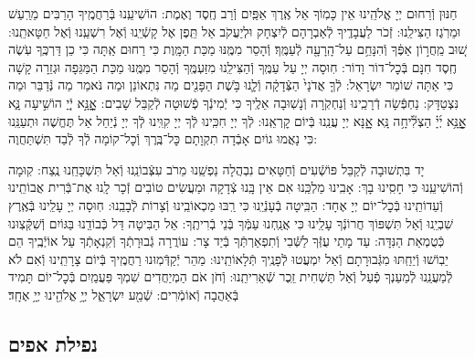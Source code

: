 \documentclass[twoside, openany, parskip=half, 11pt]{book}
\begin{document}
חַנּוּן וְֿרַחוּם יְיָ אֱלֹהֵֽינוּ אֵין כָּמֽוֹךָ אֵל אֶֽרֶךְ אַפַּֽיִם וְֿרַב חֶֽסֶד וֶאֶמֶת: הוֹשִׁיעֵֽנוּ בְּֿרַחֲמֶֽיךָ הָרַבִּים מֵרַֽעַשׁ וּמֵרֹֽגֶז הַצִּילֵֽנוּ: זְֿכֹר לַעֲבָדֶֽיךָ לְֿאַבְרָהָם לְֿיִצְחָק וּלְיַעֲקֹב אַל תֵּֽפֶן אֶל קָשְֿׁיֵֽנוּ וְֿאֶל רִשְׁעֵֽנוּ וְֿאֶל חַטָּאתֵֽנוּ:
שׁ֚וּב מֵֽחֲר֣וֹן אַפֶּ֔ךָ וְֿהִנָּחֵ֥ם עַל־הָֽרָעָ֖ה לְֿעַמֶּֽךָ׃ וְֿהָסֵר מִמֶּֽנּוּ מַכַּת הַמָּֽוֶת כִּי רַחוּם אַֽתָּה כִּי כֵן דַּרְכֶּֽךָ עֹֽשֶׂה חֶֽסֶד חִנָּם בְּֿכׇל־דוֹר וָדוֹר: חֽוּסָה יְיָ עַל עַמֶּֽךָ וְֿהַצִּילֵֽנוּ מִזַּעְמֶּֽךָ וְֿהָסֵר מִמֶּֽנּוּ מַכַּת הַמַּגֵּפָה וּגְזֵרָה קָשָׁה כִּי אַתָּה שׁוֹמֵר יִשְׂרָאֵל:
לְֿךָ֤ אֲדֹנָי֙ הַצְּֿדָקָ֔ה וְֿלָ֛נוּ בֹּ֥שֶׁת הַפָּנִ֖ים מַה נִּתְאוֹנֵן וּמַה נֹּאמַר מַה נְּֿדַבֵּר וּמַה נִּצְטַדָּק: נַחְפְּֿשָׂה דְֿרָכֵֽינוּ וְֿנַחְקֹֽרָה וְֿנָשֽׁוּבָה אֵלֶֽיךָ כִּי יְֿמִינְֿךָ פְֿשׁוּטָה לְֿקַבֵּל שָׁבִים:
אׇׇׇׇָֽנָּ֣א יְֿ֖יָ הוֹשִׁ֣יעָה נָּ֑א אׇׇׇׇָֽנָּ֥א יְ֜יָ֗ הַצְלִ֘יחָ֥ה נָּֽא׃ אׇׇָנָּא יְיָ עֲנֵֽנוּ בְּֿיוֹם קׇרְאֵֽנוּ: לְֿךָ יְיָ חִכִּֽינוּ לְֿךָ יְיָ קִוִּֽינוּ לְֿךָ יְיָ נְֿיַחֵל אַל תֶּחֱשֶׁה וּתְעַנֵּֽנוּ כִּי נָאֲמוּ גוֹיִם אָבְֿדָה תִקְוָתָם כׇּל־בֶּֽרֶךְ וְֿכׇל־קוֹמָה לְֿךָ לְֿבַד תִּשְׁתַּחֲוֶה:

יָד בִּתְשׁוּבָה לְֿקַבֵּל פּוֹשְֿׁעִים וְֿחַטָּאִים נִבְהֲלָה נַפְשֵֽׁנוּ מֵרֹב עִצְּֿבוֹנֵֽנוּ וְֿאַל תִּשְׁכָּחֵֽנוּ נֶֽצַח: קֽוּמָה וְֿהוֹשִׁיעֵֽנוּ כִּי חָסִֽינוּ בָךְ: אָבִֽינוּ מַלְכֵּֽנוּ אִם אֵין בָּֽנוּ צְֿדָקָה וּמַעֲשִׂים טוֹבִים זְֿכָר לָֽנוּ אֶת־בְּֿרִית אֲבוֹתֵֽינוּ וְֿעֵדוֹתֵֽינוּ בְּֿכׇל־יוֹם יְיָ אֶחָד: הַבִּֽיטָה בְֿעָנְֿיֵֽנוּ כִּי רַֽבּוּ מַכְאוֹבֵֽינוּ וְֿצָרוֹת לְֿבָבֵֽנוּ: חֽוּסָה יְיָ עָלֵֽינוּ בְּֿאֶֽרֶץ שִׁבְיֵֽנוּ וְֿאַל תִּשְׁפּוֹךְ חֲרוֹנְֿךָ עָלֵֽינוּ כִּי אֲנַֽחְנוּ עַמְּֿךָ בְּֿנֵי בְֿרִיתֶֽךָ: אֵל הַבִּיטָה דַּל כְּֿבוֹדֵֽנוּ בַּגּוֹיִם וְֿשִׁקְּֿצֽוּנוּ כְּֿטֻמְאַת הַנִּדָּה: עַד מָתַי עֻזְּֿךָ לַשְּֿׁבִי וְֿתִפְאַרְתְּֿךָ בְּֿיַד צָר: עוֹרֲרָה גְֿבוּרָתְֿךָ וְֿקִנְאָתְֿךָ עַל אוֹיְֿבֶֽיךָ הֵם יֵבֽוֹשׁוּ וְֿיֵחַֽתּוּ מִגְּֿבוּרָתָם וְֿאַל יִמְעֲטוּ לְֿפָנֶֽיךָ תְּֿלָאוֹתֵֽינוּ: מַהֵר יְֿקַדְּֿמֽוּנוּ רַחֲמֶֽיךָ בְּֿיוֹם צָרָתֵֽינוּ וְֿאִם לֹא לְֿמַעֲנֵֽנוּ לְֿמַעַנְךָ פְֿעַל וְֿאַל תַּשְׁחִית זֵֽכֶר שְֿׁאֵרִיתֵֽנוּ: וְֿחֹן אֹם הַמְיַחֲדִים שִׁמְךָ פַּעֲמַֽיִם בְּֿכׇל־יוֹם תָּמִיד בְּֿאַהֲבָה וְֿאוֹמְֿרִים:
שְֿׁמַ֖ע יִשְׂרָאֵ֑ל יְיָ֥ אֱלֹהֵ֖ינוּ יְיָ֥ אֶחָֽד׃

\subsection*{ נפילת אפים }
\end{document}
